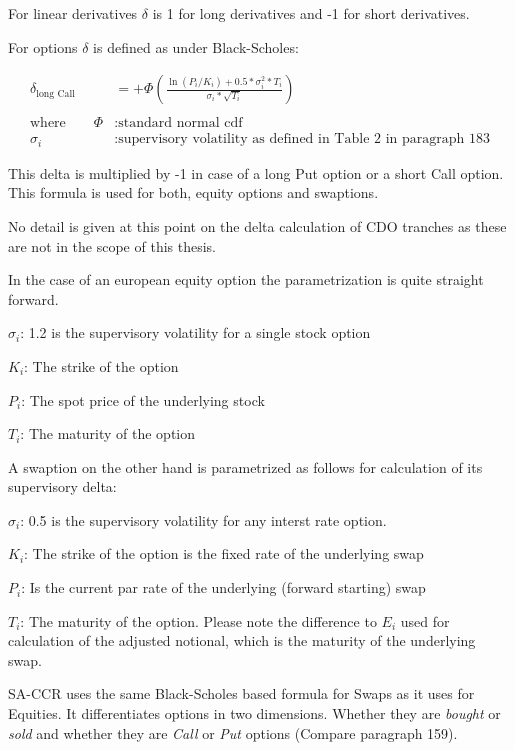 For linear derivatives \(\delta\) is 1 for long derivatives and -1 for
short derivatives.

For options \(\delta\) is defined as under Black-Scholes:

\begin{align*}
\delta_{\text{long Call}} &= +\Phi\left(\frac{\ln\left(P_i / K_i \right) + 0.5 * \sigma_i^2 * T_i}{\sigma_i * \sqrt{T_i}}\right) \\
\\
\text{where} \qquad \Phi &: \text{standard normal cdf} \\
\sigma_i &: \text{supervisory volatility as defined in Table 2 in paragraph 183}
\end{align*}

This delta is multiplied by -1 in case of a long Put option or a short
Call option. This formula is used for both, equity options and
swaptions.

No detail is given at this point on the delta calculation of CDO
tranches as these are not in the scope of this thesis.

    In the case of an european equity option the parametrization is quite
straight forward.

\(\sigma_i\): 1.2 is the supervisory volatility for a single stock
option

\(K_i\): The strike of the option

\(P_i\): The spot price of the underlying stock

\(T_i\): The maturity of the option

A swaption on the other hand is parametrized as follows for calculation
of its supervisory delta:

\(\sigma_i\): 0.5 is the supervisory volatility for any interst rate
option.

\(K_i\): The strike of the option is the fixed rate of the underlying
swap

\(P_i\): Is the current par rate of the underlying (forward starting)
swap

\(T_i\): The maturity of the option. Please note the difference to
\(E_i\) used for calculation of the adjusted notional, which is the
maturity of the underlying swap.

SA-CCR uses the same Black-Scholes based formula for Swaps as it uses
for Equities. It differentiates options in two dimensions. Whether they
are \emph{bought} or \emph{sold} and whether they are \emph{Call} or
\emph{Put} options (Compare paragraph 159).


